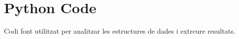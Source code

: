 \chapter{Python Code}
Codi font utilitzat per analitzar les estructures de dades i extreure resultats.